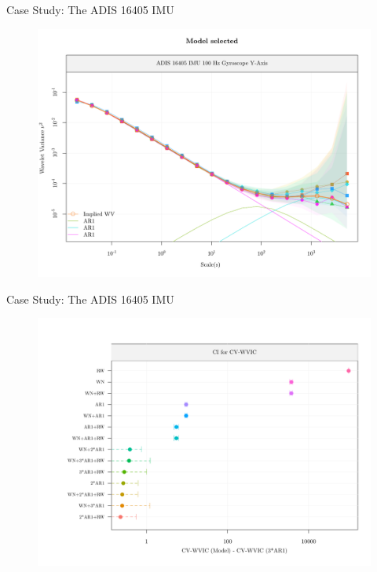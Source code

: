 \documentclass[envcountsect,usenames,dvipsnames]{beamer}
\theoremstyle{mystyle}
\begin{document}
\begin{frame}{Case Study: The ADIS 16405 IMU}
    \begin{figure}
        \centering
        \includegraphics[scale = 0.5]{Images/adis3.pdf}
    \end{figure}
\end{frame}

\begin{frame}{Case Study: The ADIS 16405 IMU}
    \begin{figure}
        \centering
        \includegraphics[scale = 0.5]{Images/adis4.pdf}
    \end{figure}
\end{frame}
\end{document}
